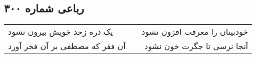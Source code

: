 \begin{center}
\section*{رباعی شماره ۳۰۰}
\label{sec:sh300}
\begin{longtable}{l p{0.5cm} r}
یک ذره زحد خویش بیرون نشود
&&
خودبینان را معرفت افزون نشود
\\
آن فقر که مصطفی بر آن فخر آورد
&&
آنجا نرسی تا جگرت خون نشود
\\
\end{longtable}
\end{center}
